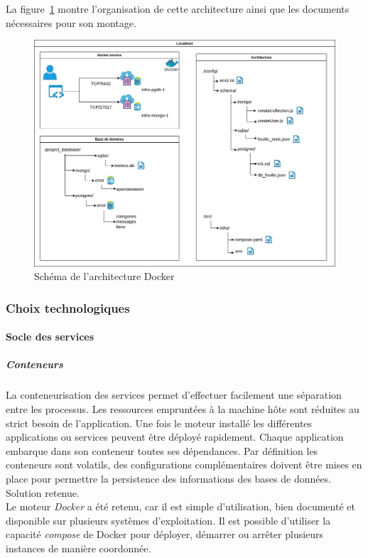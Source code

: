 	La figure~\ref{fig:Docker} montre l'organisation de cette architecture ainsi que les documents nécessaires pour son montage.
	\begin{figure}[H]
		\includegraphics[width=\linewidth]{img/SchemaDocker}
		\caption{Schéma de l'architecture Docker}
		\label{fig:Docker}
	\end{figure}

	\subsubsection*{Choix technologiques}
		\paragraph{Socle des services} 
			\subparagraph{Conteneurs}
				La conteneurisation des services permet d'effectuer facilement une séparation entre les processus.
				Les ressources empruntées à la machine hôte sont réduites au strict besoin de l'application.
				Une fois le moteur installé les différentes applications ou services peuvent être déployé rapidement.
				Chaque application embarque dans son conteneur toutes ses dépendances.
				Par définition les conteneurs sont volatils, des configurations complémentaires doivent être mises en place pour permettre la persistence des informations des bases de données.
				Solution retenue. \\
				Le moteur \emph{Docker} a été retenu, car il est simple d'utilisation, bien documenté et disponible sur plusieurs systèmes d'exploitation.
				Il est possible d'utiliser la capacité \emph{compose} de Docker pour déployer, démarrer ou arrêter plusieurs instances de manière coordonnée.

